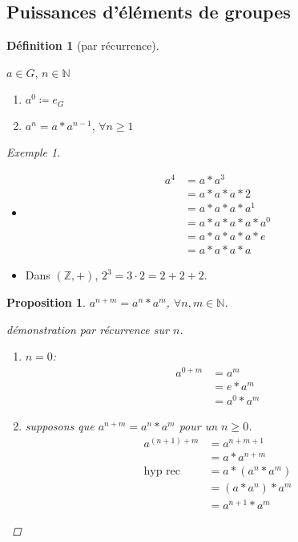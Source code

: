 \documentclass{report}
\newtheorem*{prop}{Proposition}
\theoremstyle{definition}
\newtheorem*{defin}{D\'efinition}
\theoremstyle{remark}
\newtheorem*{exem}{Exemple}
\begin{document}
	\subsection{Puissances d'\'el\'ements de groupes}
	\begin{defin}[par r\'ecurrence]~

		$a \in G$, $n \in \mathbb{N}$
		\begin{enumerate}
			\item $a^0 \coloneq e_G$
			\item $a^n=a*a^{n-1}$, $\forall n \geq 1$
		\end{enumerate}
	\end{defin}
	\begin{exem}~

		\begin{itemize}
			\item \begin{align*}
				a^4&= a*a^3\\
				&= a*a*a*2\\
				&= a*a*a*a^1\\
				&= a*a*a*a*a^0\\
				&= a*a*a*a*e\\
				&= a*a*a*a
			\end{align*}
			\item Dans $(\mathbb{Z},+)$, $2^3=3 \cdot 2=2+2+2$.
		\end{itemize}
	\end{exem}
	\begin{prop}
		$a^{n+m}=a^n*a^m$, $\forall n,m \in \mathbb{N}$.
		\begin{proof}[d\'emonstration par r\'ecurrence sur $n$]~

			\begin{enumerate}
				\item $n=0$:
				\begin{align*}
					a^{0+m}&= a^m\\
					&= e*a^m\\
					&= a^0*a^m
				\end{align*}
				\item supposons que $a^{n+m}=a^n*a^m$ pour un $n \geq 0$.
				\begin{align*}
					a^{(n+1)+m}&= a^{n+m+1}\\
					&= a*a^{n+m}\\
					\text{hyp rec}&= a*(a^n*a^m)\\
					&= (a*a^n)*a^m\\
					&= a^{n+1}*a^m
				\end{align*}
			\end{enumerate}
		\end{proof}
	\end{prop}
\end{document}
